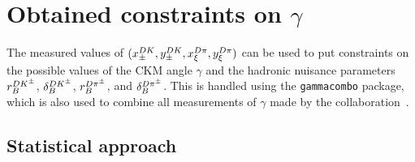
\section{\texorpdfstring{Obtained constraints on $\gamma$}{Obtained constraints on gamma}} %
\label{sec:constraints_on_gamma}

The measured values of $(x_\pm^{{D}{K}}, y_\pm^{{D}{K}}, x_\xi^{{D}\pi}, y_\xi^{{D}\pi})$ can be used to put constraints on the possible values of the CKM angle $\gamma$ and the hadronic nuisance parameters $r_B^{{{D}{{K}^\pm}}}$, $\delta_B^{{{D}{{K}^\pm}}}$, $r_B^{D\pi^\pm}$, and $\delta_B^{D\pi^\pm}$. This is handled using the \texttt{gammacombo} package, which is also used to combine all measurements of $\gamma$ made by the \lhcb collaboration~\cite{gammacombo,LHCb-PAPER-2016-032}.

\subsection{Statistical approach} %
\label{sub:statistical_approach}


